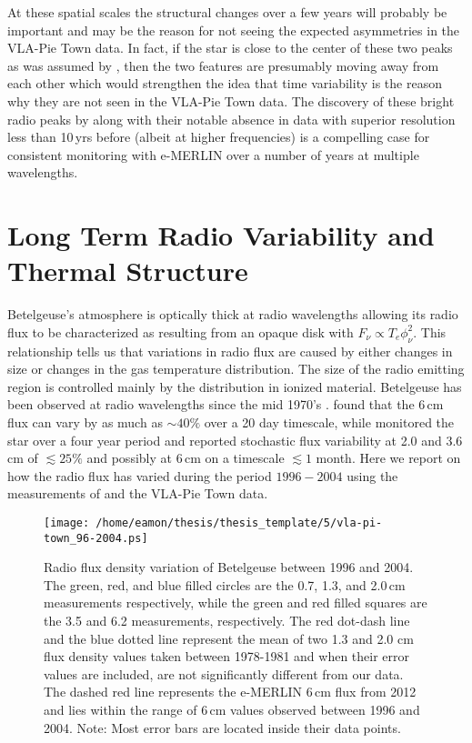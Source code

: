 At these spatial scales the structural changes over a few years will probably be important and may be the reason for not seeing the expected asymmetries in the VLA-Pie Town data. In fact, if the star is close to the center of these two peaks as was assumed by \cite{richards_2013}, then the two features are presumably moving away from each other which would strengthen the idea that time variability is the reason why they are not seen in the VLA-Pie Town data. The discovery of these bright radio peaks by \cite{richards_2013} along with their notable absence in data with superior resolution less than 10\,yrs before (albeit at higher frequencies) is a compelling case for consistent monitoring with e-MERLIN over a number of years at multiple wavelengths.

\section{Long Term Radio Variability and Thermal Structure}\label{sec:5.14}
Betelgeuse's atmosphere is optically thick at radio wavelengths allowing its radio flux to be characterized as resulting from an opaque disk with $F_{\nu} \propto T_{e}\phi _{\nu}^2$. This relationship tells us that variations in radio flux are caused by either changes in size or changes in the gas temperature distribution. The size of the radio emitting region is controlled mainly by the distribution in ionized material. Betelgeuse has been observed at radio wavelengths since the mid 1970's \cite[e.g.][]{newell_1982}. \cite{bookbinder_1987} found that the 6\,cm flux can vary by as much as $\sim 40\%$ over a 20 day timescale, while \cite{drake_1992} monitored the star over a four year period and reported stochastic flux variability at 2.0 and 3.6\,cm of $\lesssim 25\%$ and possibly at 6\,cm on a timescale $\lesssim 1$ month. Here we report on how the radio flux has varied during the period $1996-2004$ using the measurements of \cite{lim_1998} and the VLA-Pie Town data.

\begin{figure}[t!]
\centering
          \texttt{[image: /home/eamon/thesis/thesis\_template/5/vla-pi-town\_96-2004.ps]}
\caption[Radio flux density variation of Betelgeuse between $1996\rightarrow 2004$]{Radio flux density variation of Betelgeuse between 1996 and 2004. The green, red, and blue filled circles are the 0.7, 1.3, and 2.0\,cm measurements respectively, while the green and red filled squares are the 3.5 and 6.2 measurements, respectively. The red dot-dash line and the blue dotted line represent the mean of two 1.3 and 2.0 cm flux density values taken between 1978-1981 and when their error values are included, are not significantly different from our data. The dashed red line represents the e-MERLIN 6\,cm flux from 2012 and lies within the range of 6\,cm values observed between 1996 and 2004. Note: Most error bars are located inside their data points.}
\label{fig:5.16}
\end{figure}

